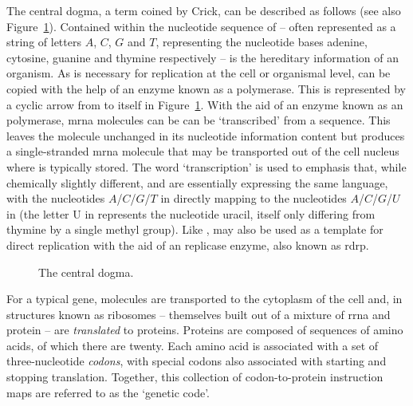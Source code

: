 \documentclass[thesis.tex]{subfiles}
\begin{document}
The central dogma, a term coined by Crick, can be described as follows (see also Figure~\ref{fig:central_dogma}). Contained within the nucleotide sequence of  -- often represented as a string of letters $A$, $C$, $G$ and $T$,  representing the nucleotide bases adenine, cytosine, guanine and thymine respectively -- is the hereditary information of an organism. As is necessary for replication at the cell or organismal level,  can be copied with the help of an enzyme known as a  polymerase. This is represented by a cyclic arrow from  to itself in Figure~\ref{fig:central_dogma}. With the aid of an enzyme known as an  polymerase, \gls{mrna} molecules can be can be `transcribed' from a  sequence. This leaves the  molecule unchanged in its nucleotide information content but produces a single-stranded \gls{mrna} molecule that may be transported out of the cell nucleus where  is typically stored. The word `transcription' is used to emphasis that, while chemically slightly different,  and  are essentially expressing the same language, with the nucleotides $A$/$C$/$G$/$T$ in  directly mapping to the nucleotides $A$/$C$/$G$/$U$ in  (the letter U in represents the nucleotide uracil, itself only differing from thymine by a single methyl group). Like ,  may also be used as a template for direct replication with the aid of an  replicase enzyme, also known as \gls{rdrp}.

\begin{figure}[htbp]
\centering
{}
\caption{The central dogma.\label{fig:central_dogma}}
\end{figure}

For a typical gene,  molecules are transported to the cytoplasm of the cell and, in structures known as ribosomes -- themselves built out of a mixture of \gls{rrna} and protein -- are \emph{translated} to proteins. Proteins are composed of sequences of amino acids, of which there are twenty. Each amino acid is associated with a set of three-nucleotide \emph{codons}, with special codons also associated with starting and stopping translation. Together, this collection of codon-to-protein instruction maps are referred to as the `genetic code'.
\end{document}
